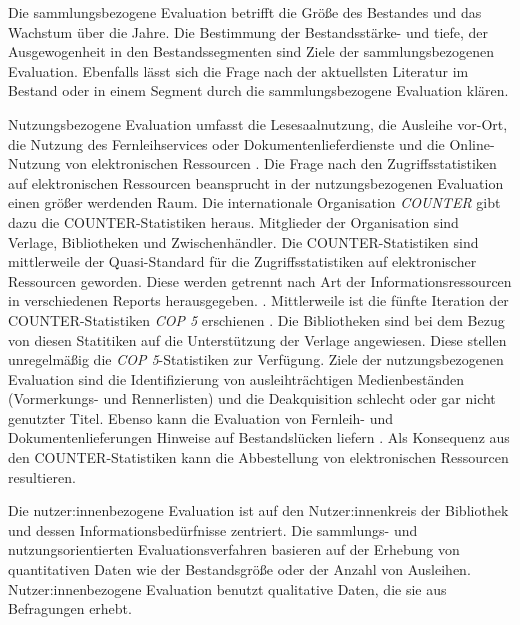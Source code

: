 Die sammlungsbezogene Evaluation betrifft die Größe des Bestandes und das Wachstum über die Jahre. Die Bestimmung der Bestandsstärke- und tiefe, 
der Ausgewogenheit in den Bestandssegmenten sind Ziele der sammlungsbezogenen Evaluation. 
Ebenfalls lässt sich die Frage nach der aktuellsten Literatur im Bestand oder in einem Segment durch die sammlungsbezogene Evaluation klären.

Nutzungsbezogene Evaluation umfasst die Lesesaalnutzung, die Ausleihe vor-Ort, die Nutzung des Fernleihservices oder Dokumentenlieferdienste und die Online-Nutzung von elektronischen Ressourcen \cite[Vgl.][254 ff.]{johannsen_jochen_bestands-_2015}.
Die Frage nach den Zugriffsstatistiken auf elektronischen Ressourcen beansprucht in der nutzungsbezogenen Evaluation einen größer werdenden Raum.
Die internationale Organisation \textit{\acrfull{COUNTER}} gibt dazu die COUNTER-Statistiken heraus. Mitglieder der Organisation sind Verlage, Bibliotheken
und Zwischenhändler. Die COUNTER-Statistiken sind mittlerweile der Quasi-Standard für die Zugriffsstatistiken 
auf elektronischer Ressourcen geworden. Diese werden getrennt nach Art der Informationsressourcen in verschiedenen Reports herausgegeben. \cite[Vgl.][260 ff.]{johannsen_jochen_bestands-_2015}. 
Mittlerweile ist die fünfte Iteration der COUNTER-Statistiken \textit{\acrshort{COP 5}} erschienen \cite[Vgl.][]{counter_abstract_2020}.
Die Bibliotheken sind bei dem Bezug von diesen Statitiken auf die Unterstützung der Verlage angewiesen. Diese stellen unregelmäßig die \textit{\acrshort{COP 5}}-Statistiken zur
Verfügung. Ziele der nutzungsbezogenen Evaluation sind die Identifizierung von ausleihträchtigen Medienbeständen (Vormerkungs- und Rennerlisten) und
die Deakquisition schlecht oder gar nicht genutzter Titel. Ebenso kann die Evaluation von Fernleih- und Dokumentenlieferungen Hinweise auf Bestandslücken liefern
\cite[Vgl.][255 ff.]{johannsen_jochen_bestands-_2015}. Als Konsequenz aus den COUNTER-Statistiken kann die Abbestellung von elektronischen Ressourcen resultieren.

Die nutzer:innenbezogene Evaluation ist auf den Nutzer:innenkreis der Bibliothek und dessen Informationsbedürfnisse zentriert. 
Die sammlungs- und nutzungsorientierten Evaluationsverfahren basieren auf der Erhebung von quantitativen Daten wie der Bestandsgröße oder der Anzahl von Ausleihen. 
Nutzer:innenbezogene Evaluation benutzt qualitative Daten, die sie aus Befragungen erhebt.

